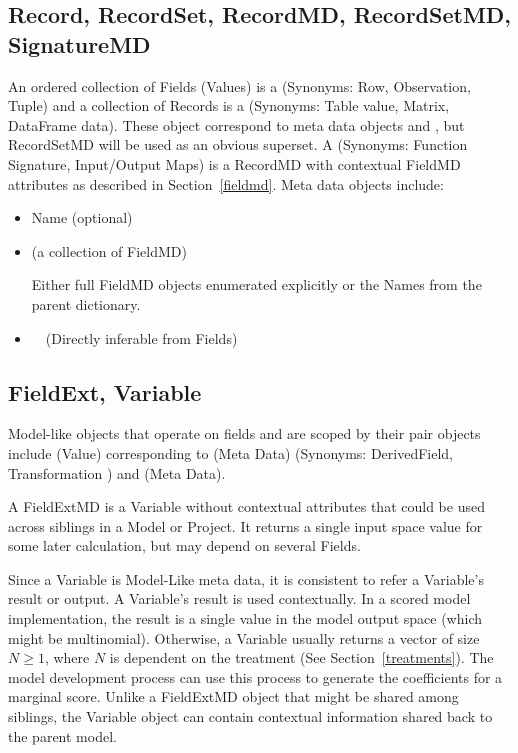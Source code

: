 \documentclass[10pt]{article}
\begin{document}
\subsection{Record, RecordSet, RecordMD, RecordSetMD, SignatureMD
    \label{record}\label{recordmd}\label{recordset}\label{recordsetmd}\label{signaturemd}}

    An ordered collection of Fields (Values) is a  (Synonyms: Row, Observation, Tuple) and a collection of Records
    is a  (Synonyms: Table value, Matrix, DataFrame data). These object correspond to meta data objects
     and , but RecordSetMD will be used as an obvious superset.   
    A  (Synonyms: Function Signature, Input/Output Maps) is a RecordMD with contextual FieldMD attributes as
    described in Section~\ref{fieldmd}.  Meta data objects include:
                \begin{itemize}[label=-,noitemsep,topsep=0pt]
                    \item Name (optional)
                    \item {} (a collection of FieldMD)\par
                        Either full FieldMD objects enumerated explicitly or the Names 
                        from the parent dictionary.
                    \item ~~(Directly inferable from Fields)
                \end{itemize}


\subsection{FieldExt, Variable}

    Model-like objects that operate on fields and are scoped by their pair objects include  (Value) corresponding to
     (Meta Data) (Synonyms: DerivedField, Transformation ) and  (Meta Data).
            
            A FieldExtMD is a Variable without contextual attributes that could be used across siblings in a Model or Project.
                It returns a single input space value for some later calculation, but may depend on several Fields.  

            Since a Variable is Model-Like meta data, it is consistent to refer a Variable's result or output.  
                A Variable's result is used contextually.   In a scored model implementation, the result is a single value 
                in the model output space (which might be multinomial).   Otherwise, a Variable 
                usually returns a vector of size $N \ge 1$, where $N$ is dependent on the treatment (See Section~\ref{treatments}).
                The model development process can use this process to generate 
                the coefficients for a marginal score.
                Unlike a FieldExtMD object that might be shared among siblings, the Variable object can contain 
                contextual information shared back to the parent model.
\end{document}
